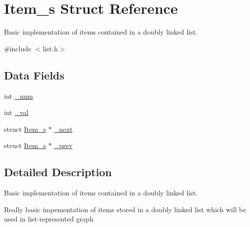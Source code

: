 \hypertarget{struct_item__s}{\section{Item\-\_\-s Struct Reference}
\label{struct_item__s}
}


Basic implementation of items contained in a doubly linked list.  




{\ttfamily \#include $<$list.\-h$>$}

\subsection*{Data Fields}
\begin{DoxyCompactItemize}
\item 
int \hyperlink{struct_item__s_a2736f16f0001a4bc44750c489864c3f4}{\-\_\-num}
\item 
int \hyperlink{struct_item__s_a84d66405cd21b56f8b33b282271cf71a}{\-\_\-val}
\item 
struct \hyperlink{struct_item__s}{Item\-\_\-s} $\ast$ \hyperlink{struct_item__s_a258b9cfe39d892032f03d6386517dbf4}{\-\_\-next}
\item 
struct \hyperlink{struct_item__s}{Item\-\_\-s} $\ast$ \hyperlink{struct_item__s_af9a311891ad1748835c3968f6a22909b}{\-\_\-prev}
\end{DoxyCompactItemize}


\subsection{Detailed Description}
Basic implementation of items contained in a doubly linked list. 

Really basic impementation of items stored in a doubly linked list which will be used in list-\/represented graph 

